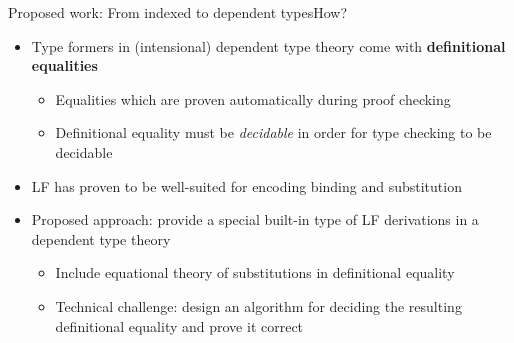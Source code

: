 \documentclass[usenames,dvipsnames]{beamer}
\begin{document}

\begin{frame}{Proposed work: From indexed to dependent types}{How?}
\begin{itemize}
\item Type formers in (intensional) dependent type theory come with \textbf{definitional equalities}
\begin{itemize}
\item Equalities which are proven automatically during proof checking
\item Definitional equality must be \emph{decidable} in order for type checking to be decidable
\end{itemize}
\item LF has proven to be well-suited for encoding binding and substitution
\item Proposed approach: provide a special built-in type of LF derivations in a dependent type theory
\begin{itemize}
\item Include equational theory of substitutions in definitional equality
\item Technical challenge: design an algorithm for deciding the resulting definitional equality and prove it correct
\end{itemize}
\end{itemize}
\end{frame}

\end{document}
